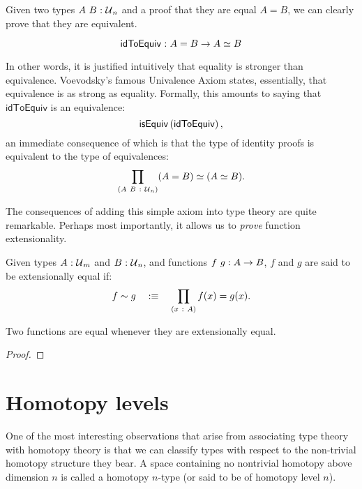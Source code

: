 Given two types $A~B\hspace{0.1mm}:\hspace{0.1mm}\mathcal{U}{}_n$ and a proof that they are equal
$A = B$, we can clearly prove that they are equivalent.
\begin{defn}
  \begin{equation*}
    \mathsf{idToEquiv}\hspace{0.1mm}:\hspace{0.1mm}A = B \rightarrow A \simeq B
  \end{equation*}
\end{defn}
In other words, it is justified intuitively that equality is stronger than equivalence.
Voevodsky's famous Univalence Axiom states, essentially, that equivalence is as strong as
equality. Formally, this amounts to saying that $\mathsf{idToEquiv}$ is an equivalence:
\begin{equation*}
  \mathsf{isEquiv}\left(\mathsf{idToEquiv}{}\right),
\end{equation*}
an immediate consequence of which is that the type of identity proofs is equivalent to the
type of equivalences:
\begin{equation*}
  \prod_{(A~B~:~\mathcal{U}{}_n)} (A = B) \simeq (A \simeq B).
\end{equation*}

The consequences of adding this simple axiom into type theory are quite remarkable.
Perhaps most importantly, it allows us to \emph{prove} function extensionality.
\begin{defn}\label{defn:exteq}
  Given types $A\hspace{0.1mm}:\hspace{0.1mm}\mathcal{U}{}_m$ and $B\hspace{0.1mm}:\hspace{0.1mm}\mathcal{U}{}_n$, and functions
  $f~g:A \rightarrow B$, $f$ and $g$ are said to be extensionally equal if:
  \begin{equation*}
    f \sim g \quad:\equiv\quad \prod_{(x~:~A)} f(x) = g(x).
  \end{equation*}
\end{defn}

\begin{prop}\label{prop:funext}
  Two functions are equal whenever they are extensionally equal.
\end{prop}
\begin{proof}
\end{proof}

\section{Homotopy levels}

One of the most interesting observations that arise from associating type theory with
homotopy theory is that we can classify types with respect to the non-trivial homotopy
structure they bear. A space containing no nontrivial homotopy above dimension $n$ is
called a homotopy $n$-type (or said to be of homotopy level $n$).

